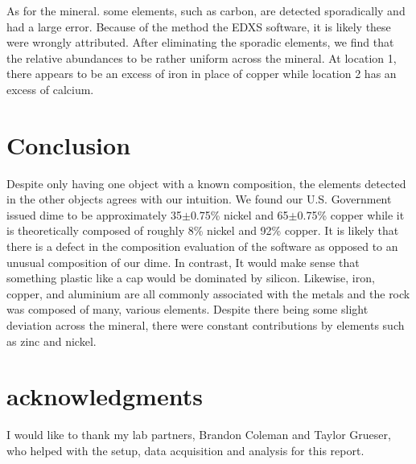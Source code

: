 \documentclass[10pt]{IEEEtran}
\begin{document}
As for the mineral. some elements, such as carbon, are detected sporadically and had a large error. Because of the method the EDXS software, it is likely these were wrongly attributed. After eliminating the sporadic elements, we find that the relative abundances to be rather uniform across the mineral. At location 1, there appears to be an excess of iron in place of copper while location 2 has an excess of calcium.
\section{Conclusion}

Despite only having one object with a known composition, the elements detected in the other objects agrees with our intuition. We found our U.S. Government issued dime to be approximately 35$\pm$0.75\% nickel and 65$\pm$0.75\% copper while it is theoretically composed of roughly 8\% nickel and 92\% copper. It is likely that there is a defect in the composition evaluation of the software as opposed to an unusual composition of our dime. In contrast, It would make sense that something plastic like a cap would be dominated by silicon. Likewise, iron, copper, and aluminium are all commonly associated with the metals and the rock was composed of many, various elements. Despite there being some slight deviation across the mineral, there were constant contributions by elements such as zinc and nickel.

\section{acknowledgments}
I would like to thank my lab partners, Brandon Coleman and Taylor Grueser, who helped with the setup, data acquisition and analysis for this report.
\printbibliography
\end{document}

